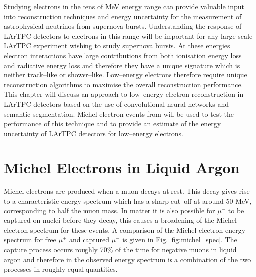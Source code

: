 Studying electrons in the tens of MeV energy range can provide valuable input 
into reconstruction techniques and energy uncertainty for the measurement of
astrophysical neutrinos from supernova bursts. Understanding the response of
LArTPC detectors to electrons in this range will be important for any large
scale LArTPC experiment wishing to study supernova bursts. At these energies
electron interactions have large contributions from both ionisation energy loss
and radiative energy loss and therefore they have a unique signature which is 
neither track--like or shower--like. Low--energy electrons therefore require 
unique reconstruction algorithms to maximise the overall reconstruction 
performance. This chapter will discuss an approach to low--energy electron
reconstruction in LArTPC detectors based on the use of convolutional neural
networks and semantic segmentation. Michel electron events from \protodune{} 
will be used to test the performance of this technique and to provide an 
estimate of the energy uncertainty of LArTPC detectors for low--energy 
electrons.


\section{Michel Electrons in Liquid Argon} \label{ME_LAr}

Michel electrons are produced when a muon decays at rest. This decay gives rise
to a characteristic energy spectrum which has a sharp cut--off at around 50 MeV,
corresponding to half the muon mass. In matter it is also possible for $\mu^-$ 
to be captured on nuclei before they decay, this causes a broadening of the 
Michel electron spectrum for these events. A comparison of the Michel electron 
energy spectrum for free $\mu^+$ and captured $\mu^-$ is given in Fig.
\ref{fig:michel_spec}. The capture process occurs roughly 70\% of the time for
negative muons in liquid argon and therefore in \protodune{} the observed energy
spectrum is a combination of the two processes in roughly equal quantities.

